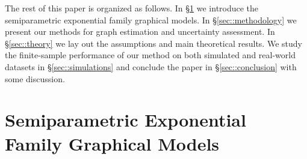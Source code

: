 \documentclass[twoside,11pt]{article}
\newcommand{\defeq}{\vcentcolon=}
\newcommand*{\BR}{\mathbb{R}}
\newcommand*{\bbetas}{\bbeta^*}
\begin{document}
The rest of this paper is organized as follows. In \S\ref{sec::background} we introduce the semiparametric exponential family graphical models. In \S\ref{sec::methodology} we present our methods for graph estimation and uncertainty assessment. In 
 \S\ref{sec::theory} we lay out the assumptions and main theoretical results. We study the finite-sample performance of our method on both simulated and real-world datasets in \S\ref{sec::simulations} and conclude the paper in  \S\ref{sec::conclusion} with some discussion.

 


\section{Semiparametric Exponential Family Graphical Models}\label{sec::background}
\end{document}
